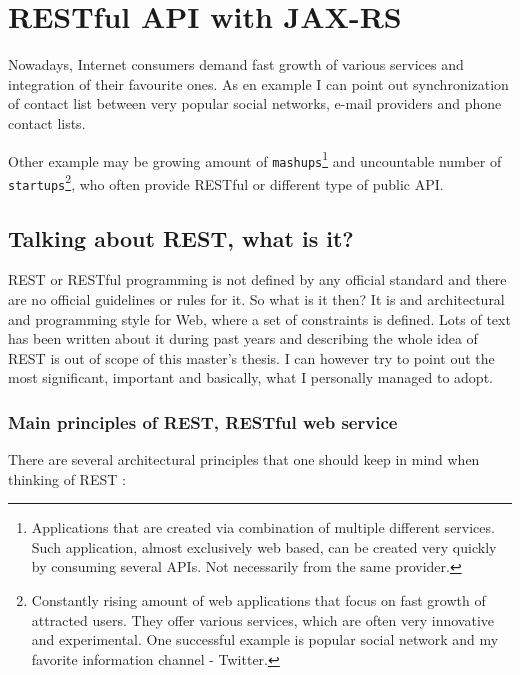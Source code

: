 \chapter{RESTful API with JAX-RS}\label{rest}

	Nowadays, Internet consumers demand fast growth of various services and integration of their favourite ones. As en
	example I can point out synchronization of contact list between very popular social networks, e-mail providers and
	phone contact lists. 
	
	Other example may be growing amount of \verb|mashups|\footnote{Applications that are created via
	combination of multiple different services. Such application, almost exclusively web based, can be created very quickly
	by consuming several \gls{API}s. Not necessarily from the same provider.} and uncountable number of
	\verb|startups|\footnote{Constantly rising amount of web applications that focus on fast growth of attracted users.
	They offer various services, which are often very innovative and experimental. One successful example is popular
	social network and my favorite information channel - Twitter.}, who often provide RESTful or different type of public
	\gls{API}.

	\section{Talking about REST, what is it?}
	
	\gls{REST} or RESTful programming is not defined by any official standard and there are no official guidelines or rules
	for it.
	So what is it then? It is and architectural and programming style for Web, where a set of constraints is defined. Lots
	of text has been written about it during past years and describing the whole idea of REST is out of scope of this
	master's thesis. I can however try to point out the most significant, important and basically, what I personally
	managed to adopt.
	
	\subsection{Main principles of REST, RESTful web service}
	
	There are several architectural principles that one should keep in mind when thinking of REST \cite[p.~3]{restful}:
	
